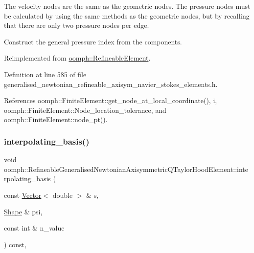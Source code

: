 The velocity nodes are the same as the geometric nodes. The pressure nodes must be calculated by using the same methods as the geometric nodes, but by recalling that there are only two pressure nodes per edge. 

Construct the general pressure index from the components. 

Reimplemented from \hyperlink{classoomph_1_1RefineableElement_ad920e66c00888c450f926f08c7793f78}{oomph\+::\+Refineable\+Element}.



Definition at line 585 of file generalised\+\_\+newtonian\+\_\+refineable\+\_\+axisym\+\_\+navier\+\_\+stokes\+\_\+elements.\+h.



References oomph\+::\+Finite\+Element\+::get\+\_\+node\+\_\+at\+\_\+local\+\_\+coordinate(), i, oomph\+::\+Finite\+Element\+::\+Node\+\_\+location\+\_\+tolerance, and oomph\+::\+Finite\+Element\+::node\+\_\+pt().

\mbox{\label{classoomph_1_1RefineableGeneralisedNewtonianAxisymmetricQTaylorHoodElement_af23c236b7f8e18b5d9d7c37309acfd74}} 
\subsubsection{\texorpdfstring{interpolating\+\_\+basis()}{interpolating\_basis()}}
{\footnotesize\ttfamily void oomph\+::\+Refineable\+Generalised\+Newtonian\+Axisymmetric\+Q\+Taylor\+Hood\+Element\+::interpolating\+\_\+basis (\begin{DoxyParamCaption}\item[{const \hyperlink{classoomph_1_1Vector}{Vector}$<$ double $>$ \&}]{s,  }\item[{\hyperlink{classoomph_1_1Shape}{Shape} \&}]{psi,  }\item[{const int \&}]{n\+\_\+value }\end{DoxyParamCaption}) const\hspace{0.3cm}{\ttfamily [inline]}, {\ttfamily [virtual]}}



